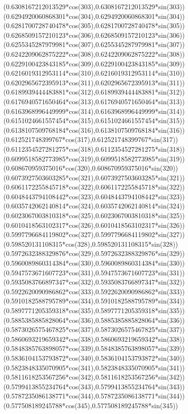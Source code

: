 {({0.6308167212013529*cos(303)},{0.6308167212013529*sin(303)})
({0.6294920060868301*cos(304)},{0.6294920060868301*sin(304)})
({0.6281700728740478*cos(305)},{0.6281700728740478*sin(305)})
({0.6268509157210123*cos(306)},{0.6268509157210123*sin(306)})
({0.6255345287979981*cos(307)},{0.6255345287979981*sin(307)})
({0.6242209062875222*cos(308)},{0.6242209062875222*sin(308)})
({0.6229100423843185*cos(309)},{0.6229100423843185*sin(309)})
({0.6216019312953114*cos(310)},{0.6216019312953114*sin(310)})
({0.6202965672395913*cos(311)},{0.6202965672395913*sin(311)})
({0.6189939444483881*cos(312)},{0.6189939444483881*sin(312)})
({0.6176940571650464*cos(313)},{0.6176940571650464*sin(313)})
({0.6163968996449999*cos(314)},{0.6163968996449999*sin(314)})
({0.6151024661557454*cos(315)},{0.6151024661557454*sin(315)})
({0.6138107509768184*cos(316)},{0.6138107509768184*sin(316)})
({0.612521748399767*cos(317)},{0.612521748399767*sin(317)})
({0.6112354527281275*cos(318)},{0.6112354527281275*sin(318)})
({0.6099518582773985*cos(319)},{0.6099518582773985*sin(319)})
({0.608670959375016*cos(320)},{0.608670959375016*sin(320)})
({0.6073927503603285*cos(321)},{0.6073927503603285*sin(321)})
({0.6061172255845718*cos(322)},{0.6061172255845718*sin(322)})
({0.6048443794108442*cos(323)},{0.6048443794108442*sin(323)})
({0.6035742062140814*cos(324)},{0.6035742062140814*sin(324)})
({0.6023067003810318*cos(325)},{0.6023067003810318*sin(325)})
({0.6010418563102317*cos(326)},{0.6010418563102317*sin(326)})
({0.5997796684119802*cos(327)},{0.5997796684119802*sin(327)})
({0.598520131108315*cos(328)},{0.598520131108315*sin(328)})
({0.5972632388329876*cos(329)},{0.5972632388329876*sin(329)})
({0.5960089860314384*cos(330)},{0.5960089860314384*sin(330)})
({0.5947573671607723*cos(331)},{0.5947573671607723*sin(331)})
({0.5935083766897347*cos(332)},{0.5935083766897347*sin(332)})
({0.5922620090986862*cos(333)},{0.5922620090986862*sin(333)})
({0.5910182588795789*cos(334)},{0.5910182588795789*sin(334)})
({0.5897771205359318*cos(335)},{0.5897771205359318*sin(335)})
({0.5885385885828064*cos(336)},{0.5885385885828064*sin(336)})
({0.5873026575467825*cos(337)},{0.5873026575467825*sin(337)})
({0.5860693219659342*cos(338)},{0.5860693219659342*sin(338)})
({0.5848385763898057*cos(339)},{0.5848385763898057*sin(339)})
({0.5836104153793872*cos(340)},{0.5836104153793872*sin(340)})
({0.5823848335070905*cos(341)},{0.5823848335070905*sin(341)})
({0.5811618253567256*cos(342)},{0.5811618253567256*sin(342)})
({0.5799413855234764*cos(343)},{0.5799413855234764*sin(343)})
({0.5787235086138771*cos(344)},{0.5787235086138771*sin(344)})
({0.577508189245788*cos(345)},{0.577508189245788*sin(345)})
}
